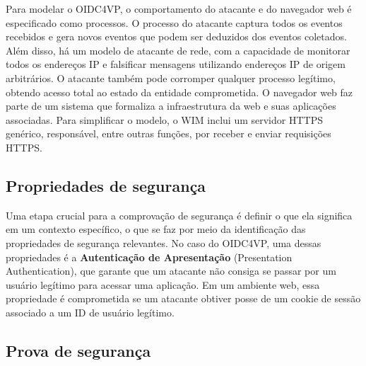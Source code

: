 Para modelar o \acs{OIDC4VP}, o comportamento do atacante e do navegador web é especificado como processos. O processo do atacante captura todos os eventos recebidos e gera novos eventos que podem ser deduzidos dos eventos coletados. Além disso, há um modelo de atacante de rede, com a capacidade de monitorar todos os endereços IP e falsificar mensagens utilizando endereços IP de origem arbitrários. O atacante também pode corromper qualquer processo legítimo, obtendo acesso total ao estado da entidade comprometida. O navegador web faz parte de um sistema que formaliza a infraestrutura da web e suas aplicações associadas. Para simplificar o modelo, o \acs{WIM} inclui um servidor HTTPS genérico, responsável, entre outras funções, por receber e enviar requisições HTTPS.



\subsection{Propriedades de segurança}\label{subsection:properties-of-formal-analysis}


Uma etapa crucial para a comprovação de segurança é definir o que ela significa em um contexto específico, o que se faz por meio da identificação das propriedades de segurança relevantes. No caso do \acs{OIDC4VP}, uma dessas propriedades é a \textbf{Autenticação de Apresentação} (Presentation Authentication), que garante que um atacante não consiga se passar por um usuário legítimo para acessar uma aplicação. Em um ambiente web, essa propriedade é comprometida se um atacante obtiver posse de um cookie de sessão associado a um ID de usuário legítimo.

\subsection{Prova de segurança}\label{subsection:proof-of-formal-analysis}


